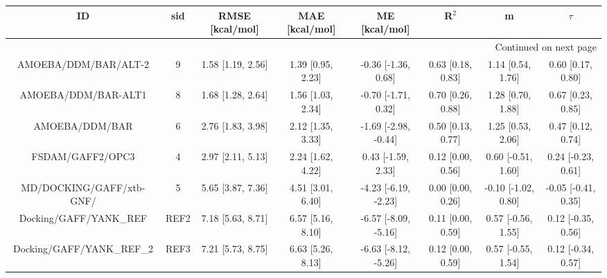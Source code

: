 \documentclass[8pt]{article}
\begin{document}
\begin{center}
\begin{footnotesize}
\begin{longtable}{|cccccccc|}
\toprule
                        ID &   sid &    RMSE [kcal/mol] &     MAE [kcal/mol] &         ME [kcal/mol] &              R$^2$ &                    m &               $\tau$ \\
\midrule
\endhead
\midrule
\multicolumn{8}{r}{{Continued on next page}} \\
\midrule
\endfoot

\bottomrule
\endlastfoot
      AMOEBA/DDM/BAR/ALT-2 &     9 &  1.58 [1.19, 2.56] &  1.39 [0.95, 2.23] &   -0.36 [-1.36, 0.68] &  0.63 [0.18, 0.83] &    1.14 [0.54, 1.76] &    0.60 [0.17, 0.80] \\
       AMOEBA/DDM/BAR-ALT1 &     8 &  1.68 [1.28, 2.64] &  1.56 [1.03, 2.34] &   -0.70 [-1.71, 0.32] &  0.70 [0.26, 0.88] &    1.28 [0.70, 1.88] &    0.67 [0.23, 0.85] \\
            AMOEBA/DDM/BAR &     6 &  2.76 [1.83, 3.98] &  2.12 [1.35, 3.33] &  -1.69 [-2.98, -0.44] &  0.50 [0.13, 0.77] &    1.25 [0.53, 2.06] &    0.47 [0.12, 0.74] \\
          FSDAM/GAFF2/OPC3 &     4 &  2.97 [2.11, 5.13] &  2.24 [1.62, 4.22] &    0.43 [-1.59, 2.33] &  0.12 [0.00, 0.56] &   0.60 [-0.51, 1.60] &   0.24 [-0.23, 0.61] \\
  MD/DOCKING/GAFF/xtb-GNF/ &     5 &  5.65 [3.87, 7.36] &  4.51 [3.01, 6.40] &  -4.23 [-6.19, -2.23] &  0.00 [0.00, 0.26] &  -0.10 [-1.02, 0.80] &  -0.05 [-0.41, 0.35] \\
    Docking/GAFF/YANK\_REF &  REF2 &  7.18 [5.63, 8.71] &  6.57 [5.16, 8.10] &  -6.57 [-8.09, -5.16] &  0.11 [0.00, 0.59] &   0.57 [-0.56, 1.55] &   0.12 [-0.35, 0.56] \\
 Docking/GAFF/YANK\_REF\_2 &  REF3 &  7.21 [5.73, 8.75] &  6.63 [5.26, 8.13] &  -6.63 [-8.12, -5.26] &  0.12 [0.00, 0.59] &   0.57 [-0.55, 1.54] &   0.12 [-0.34, 0.57] \\
\end{longtable}
\end{footnotesize}
\end{center}
\end{document}
